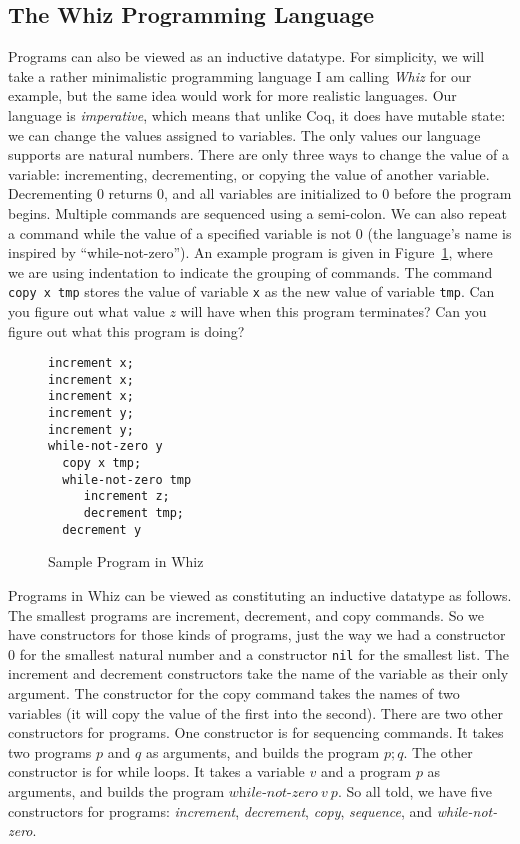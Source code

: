 \documentclass{book}[12pt]
\begin{document}
\subsection{The Whiz Programming Language}
\label{sec:whiz}

Programs can also be viewed as an inductive datatype.  For simplicity,
we will take a rather minimalistic programming language I am calling
\emph{Whiz} for our example, but the same idea would work for more
realistic languages.  Our language is \emph{imperative}, which means
that unlike Coq, it does have mutable state: we can change the values
assigned to variables.  The only values our language supports are
natural numbers.  There are only three ways to change the value of a
variable: incrementing, decrementing, or copying the value of another
variable.  Decrementing 0 returns 0, and all variables are initialized
to 0 before the program begins.  Multiple commands are sequenced using
a semi-colon.  We can also repeat a command while the value of a
specified variable is not 0 (the language's name is inspired by
``while-not-zero'').  An example program is given in
Figure~\ref{fig:whizprog}, where we are using indentation to indicate
the grouping of commands.  The command \texttt{copy x tmp} stores the
value of variable \texttt{x} as the new value of variable
\texttt{tmp}.  Can you figure out what value $z$ will have when this
program terminates?  Can you figure out what this program is doing?

\begin{figure}
\begin{verbatim}
increment x;
increment x;
increment x;
increment y;
increment y;
while-not-zero y 
  copy x tmp;
  while-not-zero tmp
     increment z;
     decrement tmp;
  decrement y
\end{verbatim}
\caption{\label{fig:whizprog}Sample Program in Whiz}
\end{figure}

Programs in Whiz can be viewed as constituting an inductive datatype
as follows.  The smallest programs are increment, decrement, and copy
commands.  So we have constructors for those kinds of programs, just
the way we had a constructor $0$ for the smallest natural number and a
constructor \texttt{nil} for the smallest list.  The increment and
decrement constructors take the name of the variable as their only
argument.  The constructor for the copy command takes the names of two
variables (it will copy the value of the first into the second).
There are two other constructors for programs.  One constructor is for
sequencing commands.  It takes two programs $p$ and $q$ as arguments,
and builds the program $p; q$.  The other constructor is for while
loops.  It takes a variable $v$ and a program $p$ as arguments, and
builds the program $\textit{while-not-zero}\ v\ p$.  So all told, we
have five constructors for programs: \textit{increment},
\textit{decrement}, \textit{copy}, \textit{sequence}, and
\textit{while-not-zero}.
\end{document}
